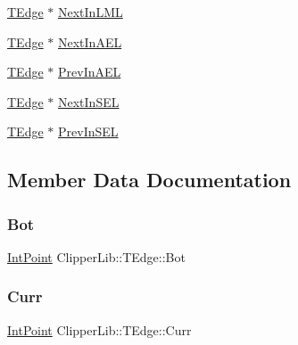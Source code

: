 \begin{DoxyCompactItemize}
\item 
\mbox{\hyperlink{struct_clipper_lib_1_1_t_edge}{T\+Edge}} $\ast$ \mbox{\hyperlink{struct_clipper_lib_1_1_t_edge_a1d0ad253e18e6fc82ed025e3d69b33de}{Next\+In\+L\+ML}}
\item 
\mbox{\hyperlink{struct_clipper_lib_1_1_t_edge}{T\+Edge}} $\ast$ \mbox{\hyperlink{struct_clipper_lib_1_1_t_edge_a7281f59250f53e96099c1f636350bbd5}{Next\+In\+A\+EL}}
\item 
\mbox{\hyperlink{struct_clipper_lib_1_1_t_edge}{T\+Edge}} $\ast$ \mbox{\hyperlink{struct_clipper_lib_1_1_t_edge_a69a6d91641e91d87bf8fb658ab5b80d1}{Prev\+In\+A\+EL}}
\item 
\mbox{\hyperlink{struct_clipper_lib_1_1_t_edge}{T\+Edge}} $\ast$ \mbox{\hyperlink{struct_clipper_lib_1_1_t_edge_a167cd4d991d27f344d875ad6fd43b862}{Next\+In\+S\+EL}}
\item 
\mbox{\hyperlink{struct_clipper_lib_1_1_t_edge}{T\+Edge}} $\ast$ \mbox{\hyperlink{struct_clipper_lib_1_1_t_edge_aa38f572c772d0bae50323f7890334c5f}{Prev\+In\+S\+EL}}
\end{DoxyCompactItemize}


\subsection{Member Data Documentation}
\mbox{\label{struct_clipper_lib_1_1_t_edge_adddb6b117ed14437613d26cc456bb4bc}} 
\subsubsection{\texorpdfstring{Bot}{Bot}}
{\footnotesize\ttfamily \mbox{\hyperlink{struct_clipper_lib_1_1_int_point}{Int\+Point}} Clipper\+Lib\+::\+T\+Edge\+::\+Bot}

\mbox{\label{struct_clipper_lib_1_1_t_edge_ad5932926d3d5d6ed6ae4bc991ed7bcec}} 
\subsubsection{\texorpdfstring{Curr}{Curr}}
{\footnotesize\ttfamily \mbox{\hyperlink{struct_clipper_lib_1_1_int_point}{Int\+Point}} Clipper\+Lib\+::\+T\+Edge\+::\+Curr}

